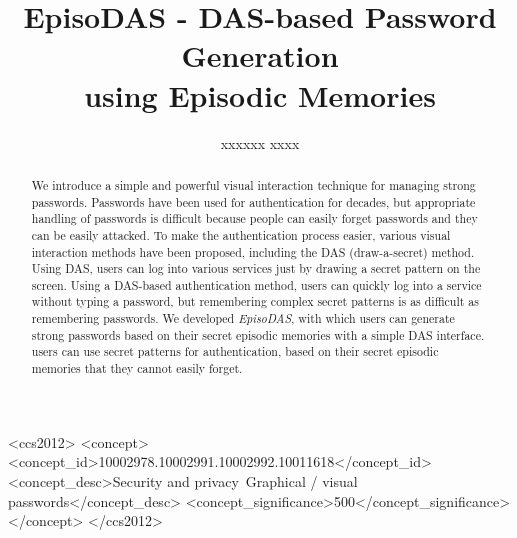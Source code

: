 \documentclass[sigconf]{acmart}
\begin{document}
\title{EpisoDAS - DAS-based Password Generation \\
using Episodic Memories}

\author{xxxxxx xxxx}


\begin{CCSXML}
  <ccs2012>
  <concept>
  <concept_id>10002978.10002991.10002992.10011618</concept_id>
  <concept_desc>Security and privacy~Graphical / visual passwords</concept_desc>
  <concept_significance>500</concept_significance>
  </concept>
  </ccs2012>
\end{CCSXML}


\begin{abstract}

We introduce a simple and powerful visual interaction technique for
managing strong passwords.
%
Passwords have been used for authentication for decades, but
appropriate handling of passwords is difficult because people can
easily forget passwords and they can be easily attacked.
%
To make the authentication process easier, various visual interaction
methods have been proposed, including the DAS (draw-a-secret)
method. Using DAS, users can log into various services just by drawing
a secret pattern on the screen.
%
Using a DAS-based authentication method, users can quickly log into a
service without typing a password, but remembering complex secret
patterns is as difficult as remembering passwords.
%
We developed \textit{EpisoDAS}, with which users can generate strong passwords
based on their secret episodic memories with a simple DAS interface.
%
users can use secret patterns for authentication, based on their
secret episodic memories that they cannot easily forget.

\end{abstract}

\maketitle
\end{document}
